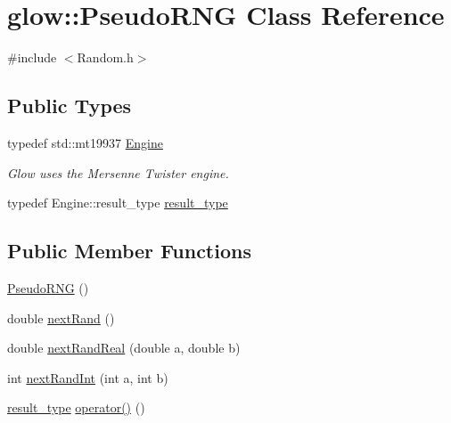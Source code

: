 \hypertarget{classglow_1_1_pseudo_r_n_g}{}\section{glow\+:\+:Pseudo\+R\+NG Class Reference}
\label{classglow_1_1_pseudo_r_n_g}


{\ttfamily \#include $<$Random.\+h$>$}

\subsection*{Public Types}
\begin{DoxyCompactItemize}
\item 
\mbox{\label{classglow_1_1_pseudo_r_n_g_ab4c3c2b212f00c6f0d9f1a2968cea564}} 
typedef std\+::mt19937 \hyperlink{classglow_1_1_pseudo_r_n_g_ab4c3c2b212f00c6f0d9f1a2968cea564}{Engine}
\begin{DoxyCompactList}\small\item\em Glow uses the Mersenne Twister engine. \end{DoxyCompactList}\item 
typedef Engine\+::result\+\_\+type \hyperlink{classglow_1_1_pseudo_r_n_g_a3fe973c9dca35c5b572da3ed711df069}{result\+\_\+type}
\end{DoxyCompactItemize}
\subsection*{Public Member Functions}
\begin{DoxyCompactItemize}
\item 
\hyperlink{classglow_1_1_pseudo_r_n_g_af2e430b238bb9d081e6771acaac0956c}{Pseudo\+R\+NG} ()
\item 
double \hyperlink{classglow_1_1_pseudo_r_n_g_a1422103880800d95e63e393e37fca771}{next\+Rand} ()
\item 
double \hyperlink{classglow_1_1_pseudo_r_n_g_ab4e260e38ef6928e8a0892e524e8b2a7}{next\+Rand\+Real} (double a, double b)
\item 
int \hyperlink{classglow_1_1_pseudo_r_n_g_ab1a884f81fbe5b640924727b0a86bb3e}{next\+Rand\+Int} (int a, int b)
\item 
\hyperlink{classglow_1_1_pseudo_r_n_g_a3fe973c9dca35c5b572da3ed711df069}{result\+\_\+type} \hyperlink{classglow_1_1_pseudo_r_n_g_a05c49b1dc4d64572e91bbc08a489d965}{operator()} ()
\end{DoxyCompactItemize}
